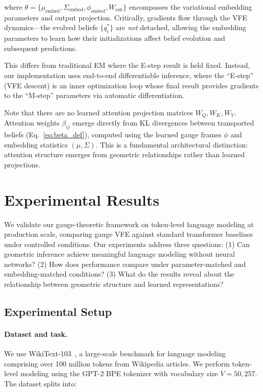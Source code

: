 \documentclass[twoside,11pt]{article}
\begin{document}
where $\theta = \{\mu_{\text{embed}}, \Sigma_{\text{embed}}, \phi_{\text{embed}}, W_{\text{out}}\}$ encompasses the variational embedding parameters and output projection. Critically, gradients flow through the VFE dynamics---the evolved beliefs $\{q_i^*\}$ are \emph{not} detached, allowing the embedding parameters to learn how their initializations affect belief evolution and subsequent predictions.

This differs from traditional EM where the E-step result is held fixed. Instead, our implementation uses end-to-end differentiable inference, where the ``E-step'' (VFE descent) is an inner optimization loop whose final result provides gradients to the ``M-step'' parameters via automatic differentiation.

Note that there are no learned attention projection matrices $W_Q, W_K, W_V$. Attention weights $\beta_{ij}$ emerge directly from KL divergences between transported beliefs (Eq.~\ref{eq:beta_def}), computed using the learned gauge frames $\phi$ and embedding statistics $(\mu, \Sigma)$. This is a fundamental architectural distinction: attention structure emerges from geometric relationships rather than learned projections.

\section{Experimental Results}
\label{sec:experiments}

We validate our gauge-theoretic framework on token-level language modeling at production scale, comparing gauge VFE against standard transformer baselines under controlled conditions. Our experiments address three questions: (1) Can geometric inference achieve meaningful language modeling without neural networks? (2) How does performance compare under parameter-matched and embedding-matched conditions? (3) What do the results reveal about the relationship between geometric structure and learned representations?

\subsection{Experimental Setup}
\label{sec:setup}

\paragraph{Dataset and task.}
We use WikiText-103~\citep{merity2016pointer}, a large-scale benchmark for language modeling comprising over 100 million tokens from Wikipedia articles. We perform token-level modeling using the GPT-2 BPE tokenizer with vocabulary size $V = 50{,}257$. The dataset splits into:
\end{document}
